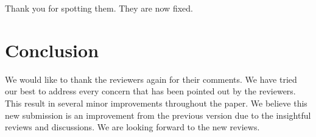 \documentclass[a4paper,twoside,10pt]{reviewresponse}
\begin{document}
Thank you for spotting them. They are now fixed.

\section{Conclusion}
We would like to thank the reviewers again for their comments.
We have tried our best to address every concern that has been pointed out by the reviewers. This result in several minor improvements throughout the paper.
We believe this new submission is an improvement from the previous version due to the insightful reviews and discussions. We are looking forward to the new reviews.

%


\end{document}
